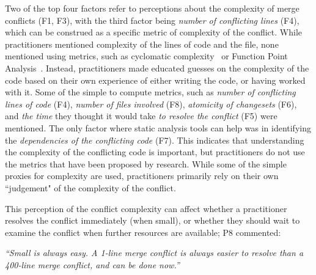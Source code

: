 \label{artifact-based-factors}
Two of the top four factors refer to perceptions about the complexity of merge conflicts (F1, F3), with the third factor being \textit{number of conflicting lines} (F4), which can be construed as a specific metric of complexity of the conflict. 
While practitioners mentioned complexity of the lines of code and the file, none mentioned using metrics, such as cyclomatic complexity~\cite{fenton2000quantitative}\cite{mccabe1976complexity} or Function Point Analysis~\cite{garmus2001fpa}\cite{symons1988function}. 
Instead, practitioners made educated guesses on the complexity of the code based on their own experience of either writing the code, or having worked with it. 
Some of the simple to compute metrics, such as \textit{number of conflicting lines of code} (F4), \textit{number of files involved} (F8), \textit{atomicity of changesets} (F6), and \textit{the time} they thought it would take \textit{to resolve the conflict} (F5) were mentioned. 
The only factor where static analysis tools can help was in identifying the \textit{dependencies of the conflicting code} (F7).
This indicates that understanding the complexity of the conflicting code is important, but practitioners do not use the metrics that have been proposed by research. While some of the simple proxies for complexity are used, practitioners primarily rely on their own ``judgement" of the complexity of the conflict.



This perception of the conflict complexity can affect whether a practitioner resolves the conflict immediately (when small), or whether they should wait to examine the conflict when further resources are available; P8 commented:
\begin{quoting}
\textit{``Small is always easy. A 1-line merge conflict is always easier to resolve than a 400-line merge conflict, and can be done now.''}
\end{quoting}

